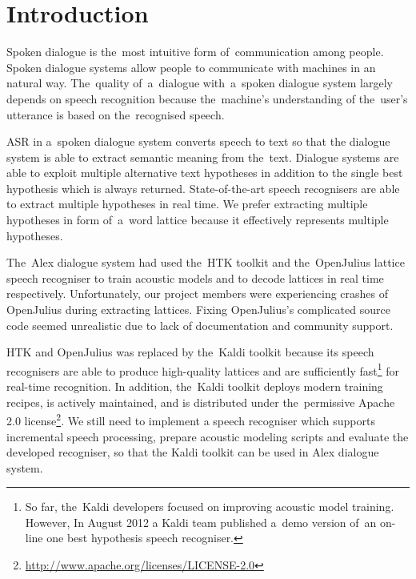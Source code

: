 \chapter{Introduction}
\label{cha:intro}

Spoken dialogue is the~most intuitive form of~communication among people. 
Spoken dialogue systems allow people to communicate with machines in an natural way.
The~quality of~a~dialogue with~a~spoken dialogue system largely depends on speech recognition because the~machine's understanding of the~user's utterance is based on the~recognised speech. 


\acf{ASR} in a~spoken dialogue system converts speech to text so that the dialogue system is able to extract semantic meaning from the~text.
Dialogue systems are able to exploit multiple alternative text hypotheses in addition to the single best hypothesis which is always returned. 
State-of-the-art speech recognisers are able to extract multiple hypotheses in real time.
We prefer extracting multiple hypotheses in form of~a~word lattice because it effectively represents multiple hypotheses.

The~Alex dialogue system had used the~\ac{HTK} toolkit\cite{young94htk} and the~OpenJulius\cite{lee2009julius} lattice speech recogniser to train acoustic models and to decode lattices in real time respectively. 
Unfortunately, our project members were experiencing crashes of OpenJulius during extracting lattices.
Fixing OpenJulius's complicated source code seemed unrealistic due to lack of documentation and community support.

HTK and OpenJulius was replaced by the~Kaldi toolkit\cite{povey2011kaldi} because its speech recognisers are able to produce high-quality lattices and are sufficiently fast\footnote{So far, 
    the~Kaldi developers focused on improving acoustic model training. 
    However, In August 2012 a Kaldi team published a~demo version of~an on-line one best hypothesis speech recogniser.} 
for real-time recognition.\cite{povey2012generating}
In addition, the~Kaldi toolkit deploys modern training recipes, is actively maintained, and is distributed under the~permissive Apache 2.0 license\footnote{\url{http://www.apache.org/licenses/LICENSE-2.0}}.
We still need to implement a speech recogniser which supports incremental speech processing, prepare acoustic modeling scripts and evaluate the developed recogniser, so that the Kaldi toolkit can be used in Alex dialogue system.

